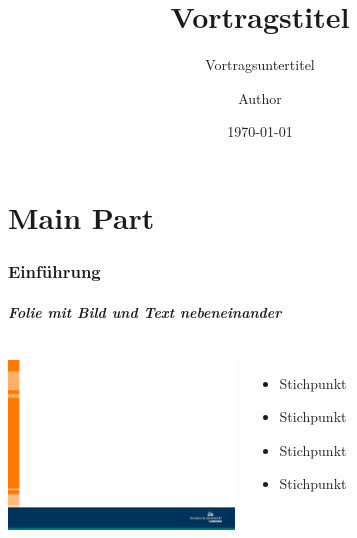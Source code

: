 
\usepackage{style/pdfpc-commands}
\usepackage{style/tuilmenau}

 
\title{Vortragstitel}
\subtitle{Vortragsuntertitel}
\author{Author}
\date{\today}
\setDualView
{}


\frame{\titlepage}%


\part{Main Part}

\section{Einführung}
\begin{frame}
\frametitle{Folie mit Bild und Text nebeneinander}
\vskip5mm
 \begin{columns}
    \column{6cm}
 	  \includegraphics[width=6.0cm]{style/images/master_background}
     \column{5cm}
      \vspace{-1cm}%
	\begin{itemize}
		 \itemsep1.2em
      	 \item Stichpunkt
      	 \item Stichpunkt
       	 \item Stichpunkt
     	 \item Stichpunkt
     \end{itemize}
 \end{columns}
\end{frame}

